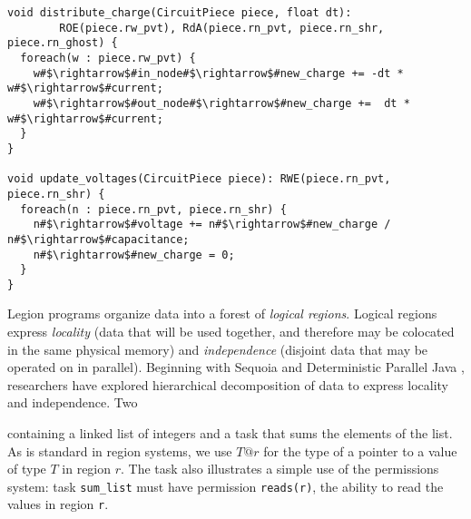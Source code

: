 \begin{lstlisting}[float={t},label={lst:code_ex},caption={Circuit simulation.}]
void distribute_charge(CircuitPiece piece, float dt):
        ROE(piece.rw_pvt), RdA(piece.rn_pvt, piece.rn_shr, piece.rn_ghost) {
  foreach(w : piece.rw_pvt) {
    w#$\rightarrow$#in_node#$\rightarrow$#new_charge += -dt * w#$\rightarrow$#current;
    w#$\rightarrow$#out_node#$\rightarrow$#new_charge +=  dt * w#$\rightarrow$#current;
  }
}

void update_voltages(CircuitPiece piece): RWE(piece.rn_pvt, piece.rn_shr) {
  foreach(n : piece.rn_pvt, piece.rn_shr) {
    n#$\rightarrow$#voltage += n#$\rightarrow$#new_charge / n#$\rightarrow$#capacitance;
    n#$\rightarrow$#new_charge = 0;
  }
}
\end{lstlisting}

Legion programs organize data into a forest of {\em logical regions}.  Logical
regions express {\em locality} (data that will be used together, and therefore may be colocated in the same
physical memory) and {\em independence} (disjoint data that may be operated on in parallel).
Beginning with Sequoia \cite{Fatahalion06} and Deterministic Parallel Java \cite{Bocchino09}, researchers
have explored hierarchical decomposition of data to express locality and independence.  Two 



containing a linked list of integers and a task that sums the elements
of the list.  As is standard in region systems, we use $T @ r$ for the
type of a pointer to a value of type $T$ in region $r$.  The task also
illustrates a simple use of the permissions system:
task {\tt sum\_list} must have permission {\tt reads(r)}, the ability
to read the values in region {\tt r}.

